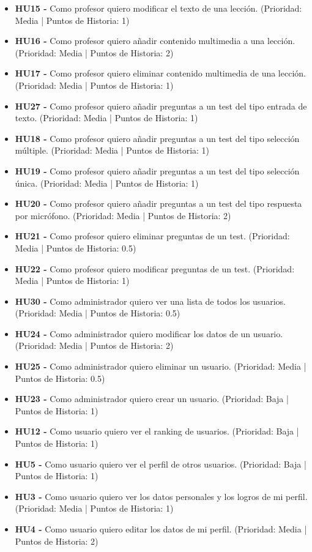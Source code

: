 \begin{itemize}
    \item \textbf{HU15 - } Como profesor quiero modificar el texto de una lección. (Prioridad: Media | Puntos de Historia: 1)
    \item \textbf{HU16 - } Como profesor quiero añadir contenido multimedia a una lección. (Prioridad: Media | Puntos de Historia: 2)
    \item \textbf{HU17 - } Como profesor quiero eliminar contenido multimedia de una lección. (Prioridad: Media | Puntos de Historia: 1)
    \item \textbf{HU27 - } Como profesor quiero añadir preguntas a un test del tipo entrada de texto. (Prioridad: Media | Puntos de Historia: 1)
    \item \textbf{HU18 - } Como profesor quiero añadir preguntas a un test del tipo selección múltiple. (Prioridad: Media | Puntos de Historia: 1)
    \item \textbf{HU19 - } Como profesor quiero añadir preguntas a un test del tipo selección única. (Prioridad: Media | Puntos de Historia: 1)
    \item \textbf{HU20 - } Como profesor quiero añadir preguntas a un test del tipo respuesta por micrófono. (Prioridad: Media | Puntos de Historia: 2)
    \item \textbf{HU21 - } Como profesor quiero eliminar preguntas de un test. (Prioridad: Media | Puntos de Historia: 0.5)
    \item \textbf{HU22 - } Como profesor quiero modificar preguntas de un test. (Prioridad: Media | Puntos de Historia: 1)
    \item \textbf{HU30 - } Como administrador quiero ver una lista de todos los usuarios. (Prioridad: Media | Puntos de Historia: 0.5)
    \item \textbf{HU24 - } Como administrador quiero modificar los datos de un usuario. (Prioridad: Media | Puntos de Historia: 2)
    \item \textbf{HU25 - } Como administrador quiero eliminar un usuario. (Prioridad: Media | Puntos de Historia: 0.5)
    \item \textbf{HU23 - } Como administrador quiero crear un usuario. (Prioridad: Baja | Puntos de Historia: 1)
    \item \textbf{HU12 - } Como usuario quiero ver el ranking de usuarios. (Prioridad: Baja | Puntos de Historia: 1)
    \item \textbf{HU5 - } Como usuario quiero ver el perfil de otros usuarios.  (Prioridad: Baja | Puntos de Historia: 1)
    \item \textbf{HU3 - } Como usuario quiero ver los datos personales y los logros de mi perfil. (Prioridad: Media | Puntos de Historia: 1)
    \item \textbf{HU4 - } Como usuario quiero editar los datos de mi perfil. (Prioridad: Media | Puntos de Historia: 2)
\end{itemize}

